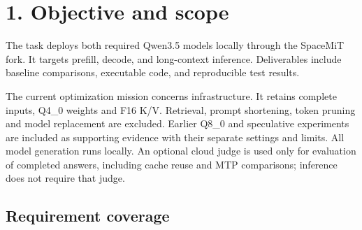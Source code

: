 \documentclass[10pt,a4paper]{article}
\begin{document}
\hypertarget{objective-and-scope}{%
\section{1. Objective and scope}\label{objective-and-scope}}

The task deploys both required Qwen3.5 models locally through the
SpaceMiT fork. It targets prefill, decode, and long-context inference.
Deliverables include baseline comparisons, executable code, and
reproducible test results.

The current optimization mission concerns infrastructure. It retains
complete inputs, Q4\_0 weights and F16 K/V. Retrieval, prompt
shortening, token pruning and model replacement are excluded. Earlier
Q8\_0 and speculative experiments are included as supporting evidence
with their separate settings and limits. All model generation runs
locally. An optional cloud judge is used only for evaluation of
completed answers, including cache reuse and MTP comparisons; inference
does not require that judge.

\hypertarget{requirement-coverage}{%
\subsection{Requirement coverage}\label{requirement-coverage}}
\end{document}
